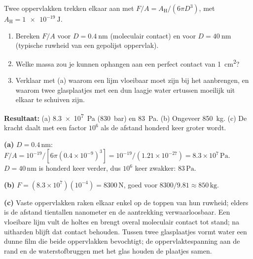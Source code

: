 \begin{oefening}
Twee oppervlakken trekken elkaar aan met $F/A = A_\mathrm{H}/(6\pi D^3)$, met $A_\mathrm{H} = \SI{1e-19}{\joule}$.
\begin{enumerate}
\item[(a)] Bereken $F/A$ voor $D = \SI{0.4}{\nano\metre}$ (moleculair contact) en voor $D = \SI{40}{\nano\metre}$ (typische ruwheid van een gepolijst oppervlak).
\item[(b)] Welke massa zou je kunnen ophangen aan een perfect contact van \SI{1}{\square\centi\metre}?
\item[(c)] Verklaar met (a) waarom een lijm vloeibaar moet zijn bij het aanbrengen, en waarom twee glasplaatjes met een dun laagje water ertussen moeilijk uit elkaar te schuiven zijn.
\end{enumerate}
\end{oefening}
\begin{oplossing}
\textbf{Resultaat:} (a) \SI{8.3e7}{\pascal} (\SI{830}{\bar}) en \SI{83}{\pascal}. (b) Ongeveer \SI{850}{\kilo\gram}. (c) De kracht daalt met een factor $10^6$ als de afstand honderd keer groter wordt.

\textbf{(a)} $D = 0.4\,\mathrm{nm}$: $F/A = 10^{-19}/[6\pi(0.4\times10^{-9})^3] = 10^{-19}/(1.21\times10^{-27}) = 8.3\times10^7\,\mathrm{Pa}$.
$D = 40\,\mathrm{nm}$ is honderd keer verder, dus $10^6$ keer zwakker: $83\,\mathrm{Pa}$.

\textbf{(b)} $F = (8.3\times10^7)(10^{-4}) = 8300\,\mathrm{N}$, goed voor $8300/9.81 \approx 850\,\mathrm{kg}$.

\textbf{(c)} Vaste oppervlakken raken elkaar enkel op de toppen van hun ruwheid; elders is de afstand tientallen nanometer en de aantrekking verwaarloosbaar. Een vloeibare lijm vult de holtes en brengt overal moleculair contact tot stand; na uitharden blijft dat contact behouden. Tussen twee glasplaatjes vormt water een dunne film die beide oppervlakken bevochtigt; de oppervlaktespanning aan de rand en de waterstofbruggen met het glas houden de plaatjes samen.
\end{oplossing}

